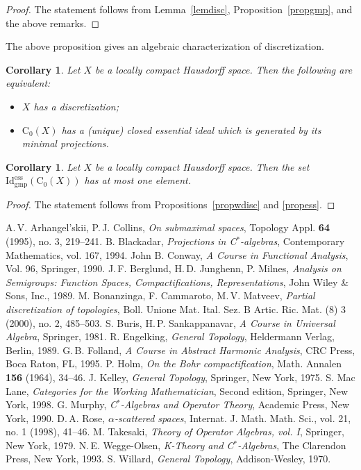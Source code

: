 \documentclass[manuscript]{amsart}
\newtheorem{corollary}[theorem]{Corollary}
\theoremstyle{definition}
\begin{document}
\begin{proof}
The statement follows from Lemma~\ref{lemdisc}, Proposition~\ref{propgmp}, and  the above remarks.
\end{proof}
The above proposition gives an algebraic characterization of discretization.
\begin{corollary}\label{cordisc}
Let $X$ be a locally compact Hausdorff space. Then the following are equivalent:
\begin{itemize}
\item[(1)]
$X$ has a discretization;
\item[(2)]
$\mathrm{C}_{0}(X)$ has a (unique) closed essential ideal which is generated by
its minimal projections.
\end{itemize}
\end{corollary}
\begin{corollary}
Let $X$ be a locally compact Hausdorff space. Then the set
$\mathrm{Id_{gmp}^{ess}}(\mathrm{C}_{0}(X))$ has at most one element.
\end{corollary}
\begin{proof}
The statement follows from  Propositions~\ref{propwdisc} and \ref{propess}.
\end{proof}
\begin{thebibliography}{99}
 A.\,V. Arhangel'skii, P.\,J. Collins, \emph{On submaximal spaces}, Topology Appl. \textbf{64}
(1995), no. 3, 219--241.
 B. Blackadar, \emph{Projections in C$^{*}$-algebras}, Contemporary Mathematics, vol. 167, 1994.
 John B. Conway, \emph{A Course in Functional Analysis}, Vol. 96, Springer, 1990.
 J.\,F. Berglund, H.\,D. Junghenn, P. Milnes,
\emph{Analysis on Semigroups: Function Spaces, Compactifications, Representations},
John Wiley \& Sons, Inc., 1989.
 M. Bonanzinga, F. Cammaroto, M.\,V. Matveev, \emph{Partial discretization of topologies},
 Boll. Unione Mat. Ital. Sez. B Artic. Ric. Mat. (8) 3 (2000), no. 2, 485--503.
 S. Buris, H.\,P. Sankappanavar, \emph{A Course in Universal Algebra}, Springer, 1981.
 R. Engelking, \emph{General Topology}, Heldermann
Verlag, Berlin, 1989.
 G.\,B. Folland,  \emph{A Course in Abstract Harmonic Analysis}, CRC Press, Boca Raton, FL, 1995.
 P. Holm, \emph{On the Bohr compactification}, Math. Annalen \textbf{156} (1964), 34--46.
 J. Kelley, \emph{General Topology}, Springer, New York, 1975.
 S. Mac Lane, \emph{Categories for the  Working Mathematician},
Second edition, Springer, New York, 1998.
 G. Murphy, \emph{C$^{*}$-Algebras and Operator Theory},
 Academic Press, New York, 1990.
 D.\,A. Rose, \emph{$\alpha$-scattered spaces}, Internat. J. Math.   Math. Sci., vol. 21, no. 1
 (1998), 41--46.
 M. Takesaki, \emph{Theory of Operator Algebras, vol. I}, Springer, New York, 1979.
 N.\,E. Wegge-Olsen, \emph{K-Theory and
C$^{*}$-Algebras}, The Clarendon Press, New York, 1993.
 S. Willard, \emph{General Topology}, Addison-Wesley, 1970.
 \end{thebibliography}
\end{document}
